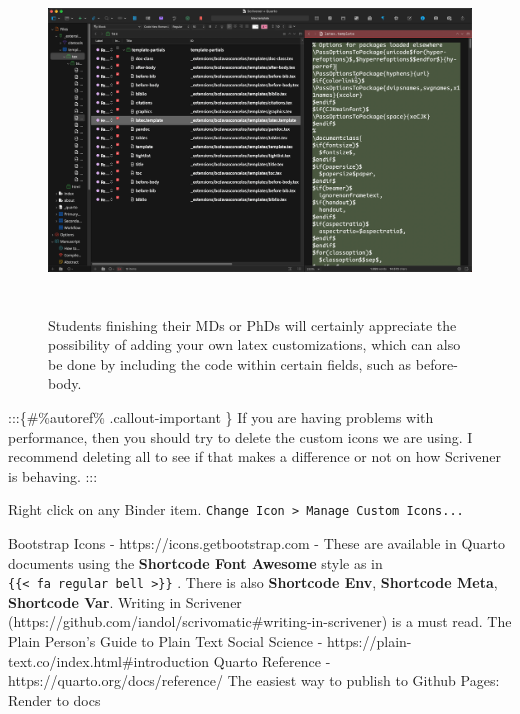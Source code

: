 \documentclass[
  12pt,
  a4paper,
  oneside,
  titlepage,
  toclink=all,
  toc=bibliography]{scrbook}
\theoremstyle{definition}
\theoremstyle{definition}
\theoremstyle{plain}
\theoremstyle{definition}
\theoremstyle{plain}
\theoremstyle{plain}
\theoremstyle{plain}
\theoremstyle{plain}
\theoremstyle{remark}
\begin{document}
\begin{figure}

{\centering \includegraphics[width=5.69792in,height=3.5625in]{pandocquartolatextemplate.png}

}

\caption{\label{fig-scriv206}Students finishing their MDs or PhDs will
certainly appreciate the possibility of adding your own latex
customizations, which can also be done by including the code within
certain fields, such as before-body.}

\end{figure}

:::\{\#\%autoref\% .callout-important \} If you are having problems with
performance, then you should try to delete the custom icons we are
using. I recommend deleting all to see if that makes a difference or not
on how Scrivener is behaving. :::

\begin{tcolorbox}[enhanced jigsaw, colbacktitle=quarto-callout-tip-color!10!white, arc=.35mm, titlerule=0mm, colframe=quarto-callout-tip-color-frame, coltitle=black, leftrule=.75mm, bottomrule=.15mm, opacityback=0, toptitle=1mm, breakable, bottomtitle=1mm, title=\textcolor{quarto-callout-tip-color}{\faLightbulb}\hspace{0.5em}{Tip}, toprule=.15mm, rightrule=.15mm, colback=white, opacitybacktitle=0.6, left=2mm]

Right click on any Binder item.
\texttt{Change\ Icon\ \textgreater{}\ Manage\ Custom\ Icons...}

\end{tcolorbox}

\protect\hypertarget{scriv209}{}{} Bootstrap Icons -
https://icons.getbootstrap.com - These are available in Quarto documents
using the \textbf{Shortcode Font Awesome} style as in
\texttt{\{\{\textless{}\ fa\ regular\ bell\ \textgreater{}\}\}} . There
is also \textbf{Shortcode Env}, \textbf{Shortcode Meta},
\textbf{Shortcode Var}. Writing in Scrivener
(https://github.com/iandol/scrivomatic\#writing-in-scrivener) is a must
read. The Plain Person's Guide to Plain Text Social Science -
https://plain-text.co/index.html\#introduction Quarto Reference -
https://quarto.org/docs/reference/ The easiest way to publish to Github
Pages: Render to docs
\end{document}
